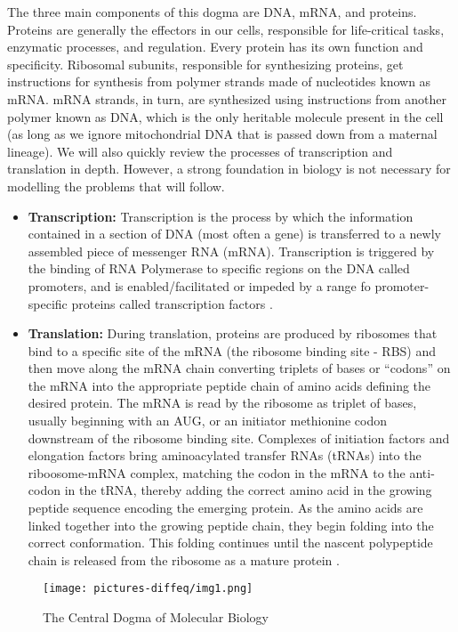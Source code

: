 The three main components of this dogma are DNA, mRNA, and proteins. Proteins are generally the effectors in our cells, responsible for life-critical tasks, enzymatic processes, and regulation. Every protein has its own function and specificity. Ribosomal subunits, responsible for synthesizing proteins, get instructions for synthesis from polymer strands made of nucleotides known as mRNA. mRNA strands, in turn, are synthesized using instructions from another polymer known as DNA, which is the only heritable molecule present in the cell (as long as we ignore mitochondrial DNA that is passed down from a maternal lineage). We will also quickly review the processes of transcription and translation in depth. However, a strong foundation in biology is not necessary for modelling the problems that will follow. \\

\begin{itemize}
    \item \textbf{Transcription: } Transcription is the process by which the information contained in a section of DNA (most often a gene) is transferred to a newly assembled piece of messenger RNA (mRNA). Transcription is triggered by the binding of RNA Polymerase to specific regions on the DNA called promoters, and is enabled/facilitated or impeded by a range fo promoter-specific proteins called transcription factors \cite{stan}.
    \item \textbf{Translation: } During translation, proteins are produced by ribosomes that bind to a specific site of the mRNA (the ribosome binding site - RBS) and then move along the mRNA chain converting triplets of bases or ``codons'' on the mRNA into the appropriate peptide chain of amino acids defining the desired protein. The mRNA is read by the ribosome as triplet of bases, usually beginning with an AUG, or an initiator methionine codon downstream of the ribosome binding site. Complexes of initiation factors and elongation factors bring aminoacylated transfer RNAs (tRNAs) into the riboosome-mRNA complex, matching the codon in the mRNA to the anti-codon in the tRNA, thereby adding the correct amino acid in the growing peptide sequence encoding the emerging protein. As the amino acids are linked together into the growing peptide chain, they begin folding into the correct conformation. This folding continues until the nascent polypeptide chain is released from the ribosome as a mature protein \cite{stan}.
\end{itemize}

\begin{figure}[H]
    \centering
    \texttt{[image: pictures-diffeq/img1.png]}
    \caption{The Central Dogma of Molecular Biology}
\end{figure}

